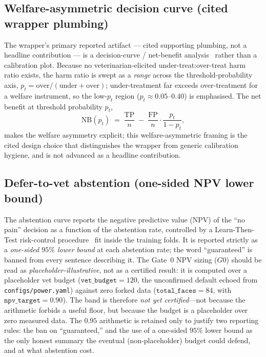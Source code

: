 \subsection{Welfare-asymmetric decision curve (cited wrapper plumbing)}

The wrapper's primary reported artifact --- cited supporting plumbing, not a headline
contribution --- is a decision-curve / net-benefit analysis~\cite{vickers2006dca}
rather than a calibration plot. Because no veterinarian-elicited under-treat:over-treat harm
ratio exists, the harm ratio is swept as a \emph{range} across the threshold-probability axis,
$p_t = \text{over}/(\text{under}+\text{over})$; under-treatment far exceeds over-treatment for a
welfare instrument, so the low-$p_t$ region ($p_t \approx 0.05\text{--}0.40$) is emphasised. The
net benefit at threshold probability $p_t$,
\[
\mathrm{NB}(p_t) \;=\; \frac{\mathrm{TP}}{n} \;-\; \frac{\mathrm{FP}}{n}\cdot\frac{p_t}{1-p_t},
\]
makes the welfare asymmetry explicit; this welfare-asymmetric framing is the cited design choice
that distinguishes the wrapper from generic calibration hygiene, and is not advanced as a
headline contribution.

\subsection{Defer-to-vet abstention (one-sided NPV lower bound)}

The abstention curve reports the negative predictive value (NPV) of the ``no pain'' decision
as a function of the abstention rate, controlled by a Learn-Then-Test risk-control
procedure~\cite{angelopoulos2021ltt} fit inside the training folds. It is reported strictly as a
\emph{one-sided $95\%$ lower bound} at each abstention rate; the word ``guaranteed'' is banned
from every sentence describing it. The Gate~0 NPV sizing ($G0$) should be read as
\emph{placeholder-illustrative}, not as a certified result: it is computed over a placeholder vet
budget ($\texttt{vet\_budget}{=}120$, the unconfirmed default echoed from \texttt{configs/power.yaml})
against zero forked data ($\texttt{total\_faces}{=}84$, with $\texttt{npv\_target}{=}0.90$). The
band is therefore \emph{not yet certified}---not because the arithmetic forbids a useful floor,
but because the budget is a placeholder over zero measured data. The $0.95$ arithmetic is retained
only to justify two reporting rules: the ban on ``guaranteed,'' and the use of a one-sided $95\%$
lower bound as the only honest summary the eventual (non-placeholder) budget could defend, and at
what abstention cost.

